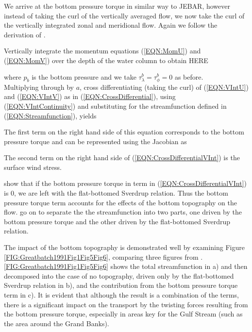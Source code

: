 \documentclass[..\EOYR.tex]{subfiles}
\begin{document}
We arrive at the bottom pressure torque in similar way to JEBAR, however instead of taking the curl of the vertically averaged flow, we now take the curl of the vertically integrated zonal and meridional flow.
Again we follow the derivation of \citep{Greatbatch1991}.

Vertically integrate the momentum equations (\ref{EQN:MomU}) and (\ref{EQN:MomV}) over the depth of the water column to obtain HERE


where $p_b$ is the bottom pressure and we take $\tau_\lambda^b=\tau_\phi^b=0$ as before.\\
Multiplying through by $a$, cross differentiating (taking the curl) of (\ref{EQN:VIntU}) and (\ref{EQN:VIntV}) as in (\ref{EQN:CrossDifferential}), using (\ref{EQN:VIntContinuity}) and substituting for the streamfunction defined in (\ref{EQN:Streamfunction}), yields



The first term on the right hand side of this equation corresponds to the bottom pressure torque and can be represented using the Jacobian as



The second term on the right hand side of (\ref{EQN:CrossDifferentialVInt}) is the surface wind stress.

\citep{Greatbatch1991} show that if the bottom pressure torque in term in (\ref{EQN:CrossDifferentialVInt}) is 0, we are left with the flat-bottomed Sverdrup relation. Thus the bottom pressure torque term accounts for the effects of the bottom topography on the flow. \citep{Greatbatch1991} go on to separate the the streamfunction into two parts, one driven by the bottom pressure torque and the other driven by the flat-bottomed Sverdrup relation.
\par The impact of the bottom topography is demonstrated well by examining Figure \ref{FIG:Greatbatch1991Fig1Fig5Fig6}, comparing three figures from \citep{Greatbatch1991}. \ref{FIG:Greatbatch1991Fig1Fig5Fig6} shows the total streamfunction in a) and then decomposed into the case of no topography, driven only by the flat-bottomed Sverdrup relation in b), and the contribution from the bottom pressure torque term in c). It is evident that although the result is a combination of the terms, there is a significant impact on the transport by the twisting forces resulting from the bottom pressure torque, especially in areas key for the Gulf Stream (such as the area around the Grand Banks).
\end{document}
